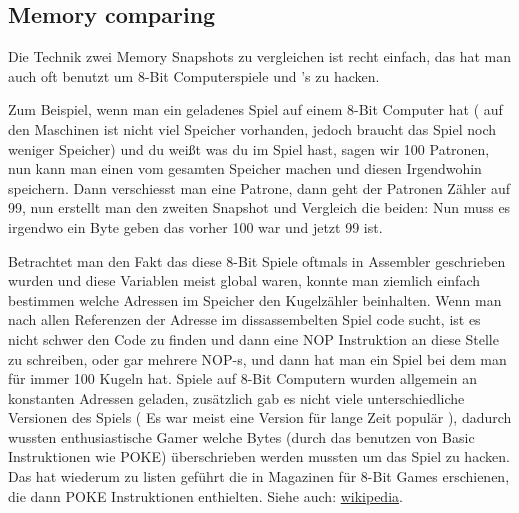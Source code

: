 \subsection{Memory  comparing}
\label{snapshots_comparing}

Die Technik zwei Memory Snapshots zu vergleichen ist recht einfach, das hat man auch oft benutzt um 8-Bit Computerspiele und
's  zu hacken.

Zum Beispiel, wenn man ein geladenes Spiel auf einem 8-Bit Computer hat ( auf den Maschinen ist nicht viel Speicher 
vorhanden, jedoch braucht das Spiel noch weniger Speicher) und du weißt was du im Spiel hast, sagen wir 100 Patronen, 
nun kann man einen  vom gesamten Speicher machen und diesen Irgendwohin speichern. Dann verschiesst man 
eine Patrone, dann geht der Patronen Z\"ahler auf 99, nun erstellt man den zweiten Snapshot und Vergleich die beiden: 
Nun muss es irgendwo ein Byte geben das vorher 100 war und jetzt 99 ist. 


Betrachtet man den Fakt das diese 8-Bit Spiele oftmals in Assembler geschrieben wurden und diese Variablen meist global 
waren, konnte man ziemlich einfach bestimmen welche Adressen im Speicher den Kugelz\"ahler beinhalten. Wenn man nach allen 
Referenzen der Adresse im dissassembelten Spiel code sucht, ist es nicht schwer den Code  
zu finden und dann eine \gls{NOP} Instruktion an diese Stelle zu schreiben, oder gar mehrere \gls{NOP}-s, und dann hat man 
ein Spiel bei dem man f\"ur immer 100 Kugeln hat. %
Spiele auf 8-Bit Computern wurden allgemein an konstanten Adressen geladen, zus\"atzlich gab es nicht viele unterschiedliche
Versionen des Spiels (  Es war meist eine Version f\"ur lange Zeit popul\"ar ), dadurch wussten enthusiastische Gamer welche
Bytes (durch das benutzen von Basic Instruktionen wie \gls{POKE}) \"uberschrieben werden mussten um das Spiel zu hacken. 
Das hat wiederum zu  listen gef\"uhrt die in Magazinen f\"ur 8-Bit Games erschienen, die dann \gls{POKE} Instruktionen enthielten.
Siehe auch: \href{http://go.yurichev.com/17114}{wikipedia}.



